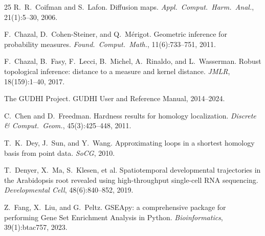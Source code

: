 \documentclass[11pt]{article}
\begin{document}
\begin{thebibliography}{25}
R.~R.~Coifman and S.~Lafon.
Diffusion maps.
\emph{Appl.\ Comput.\ Harm.\ Anal.}, 21(1):5--30, 2006.

F.~Chazal, D.~Cohen-Steiner, and Q.~M\'erigot.
Geometric inference for probability measures.
\emph{Found.\ Comput.\ Math.}, 11(6):733--751, 2011.

F.~Chazal, B.~Fasy, F.~Lecci, B.~Michel, A.~Rinaldo, and L.~Wasserman.
Robust topological inference: distance to a measure and kernel distance.
\emph{JMLR}, 18(159):1--40, 2017.

The GUDHI Project.
GUDHI User and Reference Manual, 2014--2024.

C.~Chen and D.~Freedman.
Hardness results for homology localization.
\emph{Discrete \& Comput.\ Geom.}, 45(3):425--448, 2011.

T.~K.~Dey, J.~Sun, and Y.~Wang.
Approximating loops in a shortest homology basis from point data.
\emph{SoCG}, 2010.

T.~Denyer, X.~Ma, S.~Klesen, et al.
Spatiotemporal developmental trajectories in the Arabidopsis root revealed using high-throughput single-cell RNA sequencing.
\emph{Developmental Cell}, 48(6):840--852, 2019.

Z.~Fang, X.~Liu, and G.~Peltz.
GSEApy: a comprehensive package for performing Gene Set Enrichment Analysis in Python.
\emph{Bioinformatics}, 39(1):btac757, 2023.

\end{thebibliography}
\end{document}
